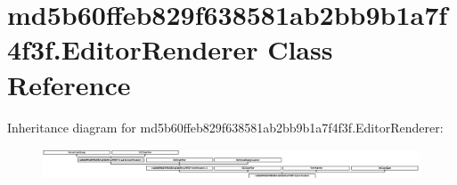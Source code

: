 \hypertarget{classmd5b60ffeb829f638581ab2bb9b1a7f4f3f_1_1EditorRenderer}{}\section{md5b60ffeb829f638581ab2bb9b1a7f4f3f.\+Editor\+Renderer Class Reference}
\label{classmd5b60ffeb829f638581ab2bb9b1a7f4f3f_1_1EditorRenderer}
Inheritance diagram for md5b60ffeb829f638581ab2bb9b1a7f4f3f.\+Editor\+Renderer\+:\begin{figure}[H]
\begin{center}
\leavevmode
\includegraphics[height=0.935673cm]{classmd5b60ffeb829f638581ab2bb9b1a7f4f3f_1_1EditorRenderer}
\end{center}
\end{figure}
